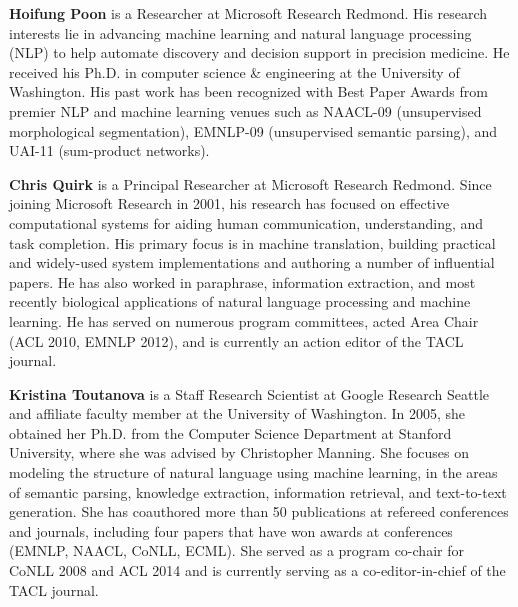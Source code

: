 \begin{bio}
  {\bfseries Hoifung Poon} is a Researcher at Microsoft Research Redmond. His research interests lie in advancing machine learning and natural language processing (NLP) to help automate discovery and decision support in precision medicine. He received his Ph.D. in computer science \& engineering at the University of Washington. His past work has been recognized with Best Paper Awards from premier NLP and machine learning venues such as NAACL-09 (unsupervised morphological segmentation), EMNLP-09 (unsupervised semantic parsing), and UAI-11 (sum-product networks).

  {\bfseries Chris Quirk} is a Principal Researcher at Microsoft Research Redmond. Since joining Microsoft Research in 2001, his research has focused on effective computational systems for aiding human communication, understanding, and task completion. His primary focus is in machine translation, building practical and widely-used system implementations and authoring a number of influential papers. He has also worked in paraphrase, information extraction, and most recently biological applications of natural language processing and machine learning. He has served on numerous program committees, acted Area Chair (ACL 2010, EMNLP 2012), and is currently an action editor of the TACL journal.

  {\bfseries Kristina Toutanova} is a Staff Research Scientist at Google Research Seattle and affiliate faculty member at the University of Washington. In 2005, she obtained her Ph.D. from the Computer Science Department at Stanford University, where she was advised by Christopher Manning. She focuses on modeling the structure of natural language using machine learning, in the areas of semantic parsing, knowledge extraction, information retrieval, and text-to-text generation. She has coauthored more than 50 publications at refereed conferences and journals, including four papers that have won awards at conferences (EMNLP, NAACL, CoNLL, ECML). She served as a program co-chair for CoNLL 2008 and ACL 2014 and is currently serving as a co-editor-in-chief of the TACL journal.


\end{bio}
